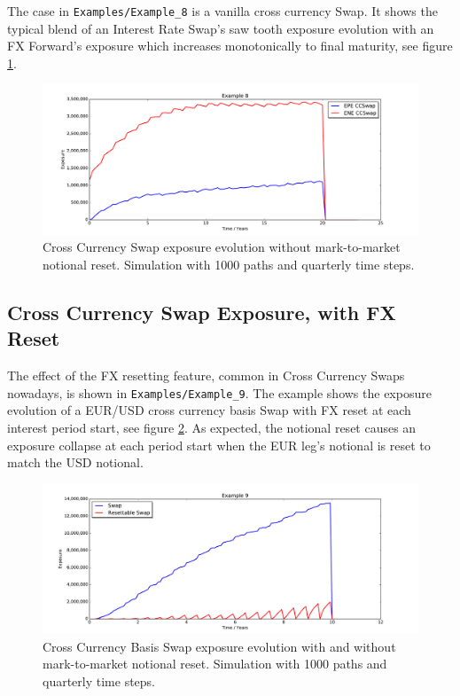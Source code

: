 \documentclass[12pt, a4paper]{article}
\begin{document}
{The case in {\tt Examples/Example\_8} is a vanilla cross currency Swap. It shows the typical blend of an Interest Rate
Swap's saw tooth exposure evolution with an FX Forward's exposure which increases monotonically to final maturity, see
figure \ref{fig_6}.
\begin{figure}[h!]
\begin{center}
\includegraphics[scale=0.45]{mpl_ccswap.pdf}
\end{center}
\caption{Cross Currency Swap exposure evolution without mark-to-market notional reset. Simulation with 1000 paths and
  quarterly time steps.}
\label{fig_6}
\end{figure}

\subsection{Cross Currency Swap Exposure, with FX Reset}

The effect of the FX resetting feature, common in Cross Currency Swaps nowadays, is shown in {\tt Examples/Example\_9}.
The example shows the exposure evolution of a EUR/USD cross currency basis Swap with FX reset at each interest period
start, see figure \ref{fig_6b}. As expected, the notional reset causes an exposure collapse at each period start when
the EUR leg's notional is reset to match the USD notional.
\begin{figure}[h!]
\begin{center}
\includegraphics[scale=0.45]{mpl_xccy_reset.pdf}
\end{center}
\caption{Cross Currency Basis Swap exposure evolution with and without mark-to-market notional reset. Simulation with
  1000 paths and quarterly time steps.}
\label{fig_6b}
\end{figure}
  
}
\end{document}
